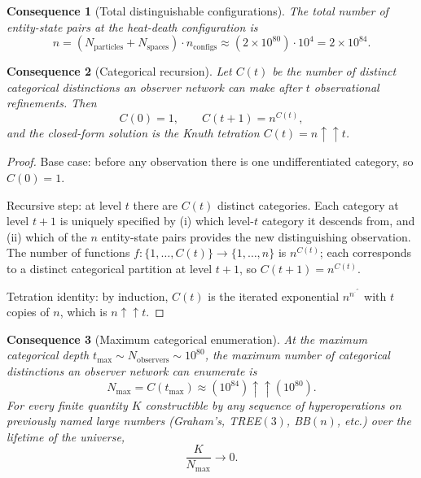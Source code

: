 \documentclass[11pt,twocolumn,a4paper]{article}
\theoremstyle{axiomstyle}
\theoremstyle{conseqstyle}
\newtheorem{consequence}{Consequence}
\theoremstyle{definition}
\theoremstyle{remark}
\begin{document}
\begin{consequence}[Total distinguishable configurations]\label{cons:totalconfigs}
The total number of entity-state pairs at the heat-death configuration is
\begin{equation}
n=(N_{\mathrm{particles}}+N_{\mathrm{spaces}})\cdot n_{\mathrm{configs}}\approx(2\times 10^{80})\cdot 10^{4}=2\times 10^{84}.
\end{equation}
\end{consequence}

\begin{consequence}[Categorical recursion]\label{cons:categoricalrecursion}
Let $C(t)$ be the number of distinct categorical distinctions an observer network can make after $t$ observational refinements. Then
\begin{equation}
C(0)=1,\qquad C(t+1)=n^{C(t)},
\end{equation}
and the closed-form solution is the Knuth tetration $C(t)=n\uparrow\uparrow t$.
\end{consequence}

\begin{proof}
Base case: before any observation there is one undifferentiated category, so $C(0)=1$.

Recursive step: at level $t$ there are $C(t)$ distinct categories. Each category at level $t+1$ is uniquely specified by (i) which level-$t$ category it descends from, and (ii) which of the $n$ entity-state pairs provides the new distinguishing observation. The number of functions $f:\{1,\ldots,C(t)\}\to\{1,\ldots,n\}$ is $n^{C(t)}$; each corresponds to a distinct categorical partition at level $t+1$, so $C(t+1)=n^{C(t)}$.

Tetration identity: by induction, $C(t)$ is the iterated exponential $n^{n^{\cdot^{\cdot^{n}}}}$ with $t$ copies of $n$, which is $n\uparrow\uparrow t$.
\end{proof}

\begin{consequence}[Maximum categorical enumeration]\label{cons:Nmax}
At the maximum categorical depth $t_{\max}\sim N_{\mathrm{observers}}\sim 10^{80}$, the maximum number of categorical distinctions an observer network can enumerate is
\begin{equation}
N_{\max}=C(t_{\max})\approx(10^{84})\uparrow\uparrow(10^{80}).
\end{equation}
For every finite quantity $K$ constructible by any sequence of hyperoperations on previously named large numbers (Graham's, TREE$(3)$, BB$(n)$, etc.) over the lifetime of the universe,
\begin{equation}
\frac{K}{N_{\max}}\to 0.
\end{equation}
\end{consequence}
\end{document}
